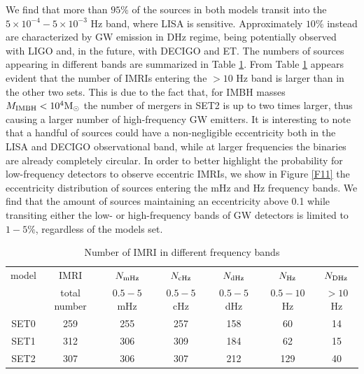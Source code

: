 \documentclass[twocolumn]{aastex62}
\newcommand{\Ms}{{\rm M}_\odot}
\newcommand{\ibh}{{\rm IMBH}}
\begin{document}
We find that more than $95\%$ of the sources in both models transit into the $5\times 10^{-4} - 5\times 10^{-3}$ Hz band, where LISA is sensitive. Approximately $10\%$ instead are characterized by GW emission in DHz regime, being potentially observed with LIGO and, in the future, with DECIGO and ET.
The numbers of sources appearing in different bands are summarized in Table \ref{tab:t4}.
From Table \ref{tab:t4} appears evident that the number of IMRIs entering the $> 10$ Hz band is larger than in the other two sets. This is due to the fact that, for IMBH masses $M_\ibh < 10^4\Ms$ the number of mergers in SET2 is up to two times larger, thus causing a larger number of high-frequency GW emitters.   
It is interesting to note that a handful of sources could have a non-negligible eccentricity both in the LISA and DECIGO observational band, while at larger frequencies the binaries are already completely circular. In order to better highlight the probability for low-frequency detectors to observe eccentric IMRIs, we show in Figure \ref{F11} the eccentricity distribution of sources entering the mHz and Hz frequency bands. We find that the amount of sources maintaining an eccentricity above 0.1 while transiting either the low- or high-frequency bands of GW detectors is limited to $1-5\%$, regardless of the models set.  
 
 \begin{table}
     \centering
     \caption{Number of IMRI in different frequency bands}
     \begin{tabular}{ccccccc}
        \hline
        \hline
        model & IMRI & $N_{\rm mHz}$ & $N_{\rm cHz}$ & $N_{\rm dHz}$ & $N_{\rm Hz}$ & $N_{\rm DHz}$ \\ 
              &    total number  &$0.5-5$ mHz    & $ 0.5-5$ cHz  &  $0.5-5$ dHz & $0.5-10$ Hz & $>10$ Hz \\
        \hline
		SET0& 259 & 255 & 257 & 158 & 60  & 14 \\
		SET1& 312 & 306 & 309 & 184 & 62  & 15 \\
		SET2& 307 & 306 & 307 & 212 & 129 & 40 \\
        \hline
     \end{tabular}
     \label{tab:t4}
 \end{table}
 
\end{document}
